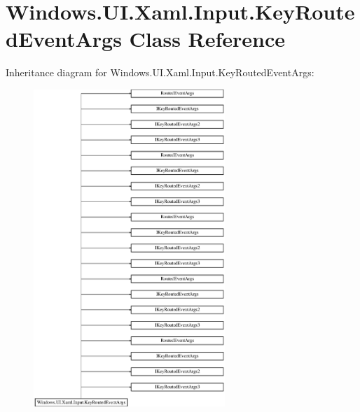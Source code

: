 \hypertarget{class_windows_1_1_u_i_1_1_xaml_1_1_input_1_1_key_routed_event_args}{}\section{Windows.\+U\+I.\+Xaml.\+Input.\+Key\+Routed\+Event\+Args Class Reference}
\label{class_windows_1_1_u_i_1_1_xaml_1_1_input_1_1_key_routed_event_args}
Inheritance diagram for Windows.\+U\+I.\+Xaml.\+Input.\+Key\+Routed\+Event\+Args\+:\begin{figure}[H]
\begin{center}
\leavevmode
\includegraphics[height=12.000000cm]{class_windows_1_1_u_i_1_1_xaml_1_1_input_1_1_key_routed_event_args}
\end{center}
\end{figure}
